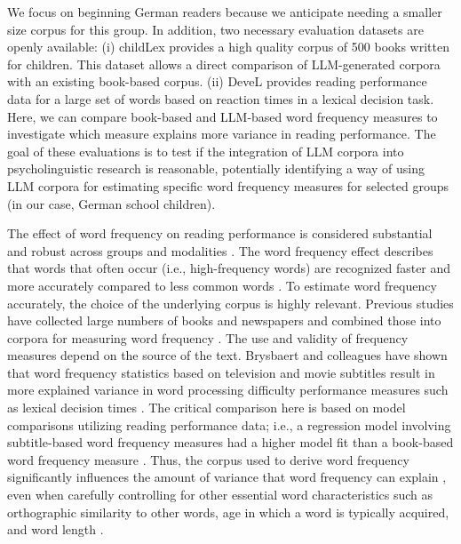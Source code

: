 \documentclass[doc, a4paper]{apa7}
\begin{document}
We focus on beginning German readers because we anticipate needing a smaller size corpus for this group. In addition, two necessary evaluation datasets are openly available: (i) childLex \citep{schroeder_childlex_2015} provides a high quality corpus of 500 books written for children. This dataset allows a direct comparison of LLM-generated corpora with an existing book-based corpus. (ii) DeveL \citep{schroter_developmental_2017} provides reading performance data for a large set of words based on reaction times in a lexical decision task. Here, we can compare book-based and LLM-based word frequency measures to investigate which measure explains more variance in reading performance. The goal of these evaluations is to test if the integration of LLM corpora into psycholinguistic research is reasonable, potentially identifying a way of using LLM corpora for estimating specific word frequency measures for selected groups (in our case, German school children).

The effect of word frequency on reading performance is considered substantial and robust \citep{brysbaert_impact_2016, brysbaert_word_2018} across groups \citep[e.g.,][]{hawelka_dual-route_2010} and modalities \citep[e.g.,][]{gregorova_access_2023}. The word frequency effect describes that words that often occur (i.e., high-frequency words) are recognized faster and more accurately compared to less common words \citep[i.e., low-frequency words; ][]{adelman_contextual_2006, baayen_demythologizing_2010, brysbaert_impact_2016, gregorova_access_2023, hallin_effects_2018, lieven_input_2010, mcdonald_rethinking_2001, stokes_neighborhood_2010}. To estimate word frequency accurately, the choice of the underlying corpus is highly relevant. Previous studies have collected large numbers of books and newspapers and combined those into corpora for measuring word frequency \citep[e.g.,][]{baayen_celex_1993, heister_dlexdb_2011}. The use and validity of frequency measures depend on the source of the text. Brysbaert and colleagues \citep{brysbaert_word_2011, brysbaert_word_2018} have shown that word frequency statistics based on television and movie subtitles result in more explained variance in word processing difficulty performance measures such as lexical decision times \citep[see also][]{chilson_films_2024}. The critical comparison here is based on model comparisons utilizing reading performance data; i.e., a regression model involving subtitle-based word frequency measures had a higher model fit than a book-based word frequency measure \citep[see, e.g.,][]{brysbaert_word_2011}. Thus, the corpus used to derive word frequency significantly influences the amount of variance that word frequency can explain \citep{ferrand_french_2010, keuleers_subtlex-nl_2010, van_heuven_subtlex-uk_2014}, even when carefully controlling for other essential word characteristics such as orthographic similarity to other words, age in which a word is typically acquired, and word length \citep{graf_faktorenanalyse_2005}. 
\end{document}
